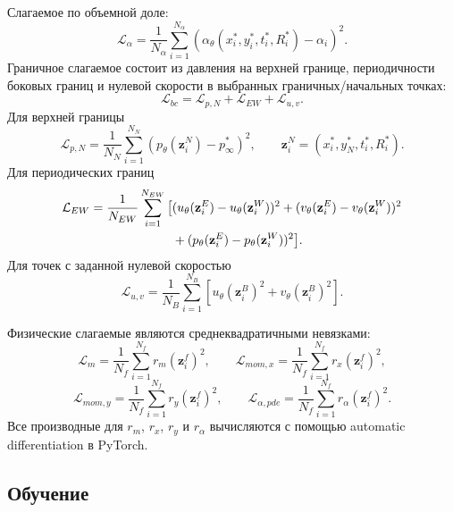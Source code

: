 \documentclass[12pt,a4paper]{article}
\begin{document}
Слагаемое по объемной доле:
\begin{equation}
    \mathcal{L}_\alpha
    =
    \frac{1}{N_\alpha}
    \sum_{i=1}^{N_\alpha}
    \left(
        \alpha_\theta(x_i^*,y_i^*,t_i^*,R_i^*)-\alpha_i
    \right)^2.
\end{equation}
Граничное слагаемое состоит из давления на верхней границе, периодичности
боковых границ и нулевой скорости в выбранных граничных/начальных точках:
\begin{equation}
    \mathcal{L}_{bc}
    =
    \mathcal{L}_{p,N}
    +
    \mathcal{L}_{EW}
    +
    \mathcal{L}_{u,v}.
\end{equation}
Для верхней границы
\begin{equation}
    \mathcal{L}_{p,N}
    =
    \frac{1}{N_N}
    \sum_{i=1}^{N_N}
    \left(p_\theta(\mathbf{z}_i^N)-p_\infty^*\right)^2,
    \qquad
    \mathbf{z}_i^N=(x_i^*,y_N^*,t_i^*,R_i^*).
\end{equation}
Для периодических границ
\begin{align}
    \mathcal{L}_{EW}
    =
    \frac{1}{N_{EW}}
    \sum_{i=1}^{N_{EW}}
    \big[
        &(u_\theta(\mathbf{z}_i^E)-u_\theta(\mathbf{z}_i^W))^2
        +(v_\theta(\mathbf{z}_i^E)-v_\theta(\mathbf{z}_i^W))^2
        \notag\\
        &+(p_\theta(\mathbf{z}_i^E)-p_\theta(\mathbf{z}_i^W))^2
    \big].
\end{align}
Для точек с заданной нулевой скоростью
\begin{equation}
    \mathcal{L}_{u,v}
    =
    \frac{1}{N_B}
    \sum_{i=1}^{N_B}
    \left[
        u_\theta(\mathbf{z}_i^B)^2
        +
        v_\theta(\mathbf{z}_i^B)^2
    \right].
\end{equation}

Физические слагаемые являются среднеквадратичными невязками:
\[
    \mathcal{L}_m
    =
    \frac{1}{N_f}\sum_{i=1}^{N_f} r_m(\mathbf{z}_i^f)^2,
    \qquad
    \mathcal{L}_{mom,x}
    =
    \frac{1}{N_f}\sum_{i=1}^{N_f} r_x(\mathbf{z}_i^f)^2,
\]
\[
    \mathcal{L}_{mom,y}
    =
    \frac{1}{N_f}\sum_{i=1}^{N_f} r_y(\mathbf{z}_i^f)^2,
    \qquad
    \mathcal{L}_{\alpha,pde}
    =
    \frac{1}{N_f}\sum_{i=1}^{N_f} r_\alpha(\mathbf{z}_i^f)^2.
\]
Все производные для \(r_m\), \(r_x\), \(r_y\) и \(r_\alpha\) вычисляются с
помощью automatic differentiation в PyTorch.

\subsection{Обучение}
\end{document}
